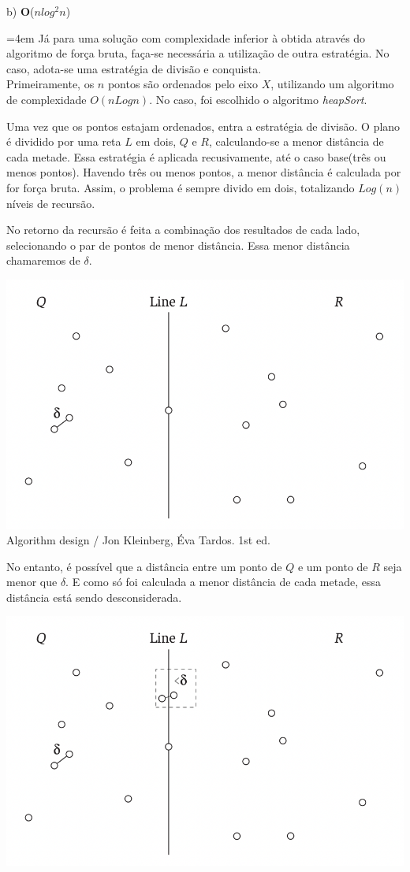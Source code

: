 \documentclass[10pt,a4paper]{letter}
\newenvironment{resposta}{%
  \par%
  \medskip
  \leftskip=4em%
  \noindent\ignorespaces}{%
  \par\medskip}
\begin{document}
\par b) \textbf{O}($nlog^{2}n$)
\begin{resposta}
Já para uma solução com complexidade inferior à obtida através do algoritmo de força bruta, faça-se necessária a utilização de outra estratégia. No caso, adota-se uma estratégia de divisão e conquista.\\ Primeiramente, os $n$ pontos são ordenados pelo eixo $X$, utilizando um algoritmo de complexidade $O(nLogn)$. No caso, foi escolhido o algoritmo \textit{heapSort}.
\par 
Uma vez que os pontos estajam ordenados, entra a estratégia de divisão. O plano é dividido por uma reta $L$ em dois, $Q$ e $R$, calculando-se a menor distância de cada metade. Essa estratégia é aplicada recusivamente, até o caso base(três ou menos pontos). Havendo três ou menos pontos, a menor distância é calculada por for força bruta. Assim, o problema é sempre divido em dois, totalizando $Log(n)$ níveis de recursão.
\par 
No retorno da recursão é feita a combinação dos resultados de cada lado, selecionando o par de pontos de menor distância. Essa menor distância chamaremos de $\delta$. 
\begin{center}
\par
\includegraphics[width=.6\textwidth]{divisao}\\
Algorithm design / Jon Kleinberg, Éva Tardos. 1st ed.
\end{center}
\newpage 
 No entanto, é possível que a distância entre um ponto de $Q$ e um ponto de $R$ seja menor que $\delta$. E como só foi calculada a menor distância de cada metade, essa distância está sendo desconsiderada.
\begin{center}
\includegraphics[width=.6\textwidth]{delta}\\

\end{center}
\end{resposta}
\end{document}
